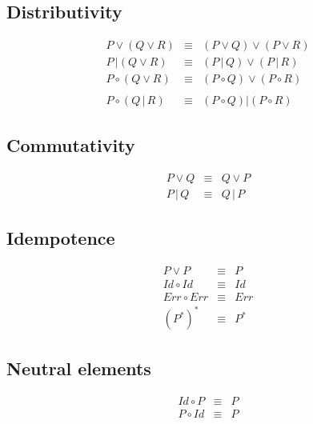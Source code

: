 \subsection{Distributivity}
\begin{eqnarray*}
  P \vee \left( Q \vee R \right) & \equiv & \left( P \vee Q \right) \vee \left( P \vee R \right) \\
  P \,| \left( Q \vee R \right) & \equiv & \left( P \,|\, Q \right) \vee \left( P \,|\, R \right) \\
  P \circ \left( Q \vee R \right) & \equiv & \left( P \circ Q \right) \vee \left( P \circ R \right) \\
  & & \\
  P \circ \left( Q \,|\, R \right) & \equiv & \left( P \circ Q \right) | \left( P \circ R \right)
\end{eqnarray*}

\subsection{Commutativity}
\begin{eqnarray*}
  P \vee Q & \equiv & Q \vee P \\
  P \,|\, Q & \equiv & Q \,|\, P
\end{eqnarray*}

\subsection{Idempotence}
\begin{eqnarray*}
  P \vee P & \equiv & P \\
  Id \circ Id & \equiv & Id \\
  Err \circ Err & \equiv & Err \\
  (P^*)^* & \equiv & P^*
\end{eqnarray*}

\subsection{Neutral elements}
\begin{eqnarray*}
  Id \circ P & \equiv & P \\
  P \circ Id & \equiv & P
\end{eqnarray*}